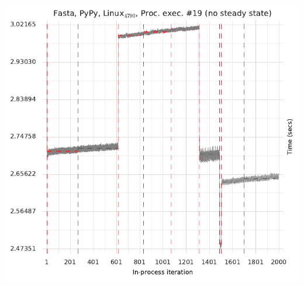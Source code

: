 \documentclass[acmlarge]{acmart}\settopmatter{printfolios=true}
\begin{document}
\includegraphics[width=.49\textwidth]{category_examples/nosteadystate/nosteadystate3.pdf}
\end{document}
